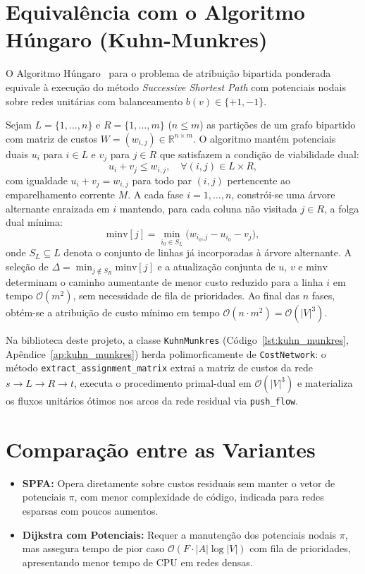 \section{Equivalência com o Algoritmo Húngaro (Kuhn-Munkres)}\label{sec:kuhn_munkres_eq}

O Algoritmo Húngaro~\cite{kuhn1955hungarian, munkres1957algorithms} para o problema de atribuição bipartida ponderada equivale à execução do método \textit{Successive Shortest Path} com potenciais nodais sobre redes unitárias com balanceamento $b(v) \in \{+1, -1\}$.

Sejam $L = \{1, \dots, n\}$ e $R = \{1, \dots, m\}$ ($n \le m$) as partições de um grafo bipartido com matriz de custos $W = (w_{i,j}) \in \mathbb{R}^{n \times m}$. O algoritmo mantém potenciais duais $u_i$ para $i \in L$ e $v_j$ para $j \in R$ que satisfazem a condição de viabilidade dual:
\begin{equation}
    u_i + v_j \le w_{i,j}, \quad \forall (i, j) \in L \times R,
\end{equation}
com igualdade $u_i + v_j = w_{i,j}$ para todo par $(i, j)$ pertencente ao emparelhamento corrente $M$. A cada fase $i = 1, \dots, n$, constrói-se uma árvore alternante enraizada em $i$ mantendo, para cada coluna não visitada $j \in R$, a folga dual mínima:
\begin{equation}
    \text{minv}[j] = \min_{i_0 \in S_L} \bigl(w_{i_0, j} - u_{i_0} - v_j\bigr),
\end{equation}
onde $S_L \subseteq L$ denota o conjunto de linhas já incorporadas à árvore alternante. A seleção de $\Delta = \min_{j \notin S_R} \text{minv}[j]$ e a atualização conjunta de $u$, $v$ e $\text{minv}$ determinam o caminho aumentante de menor custo reduzido para a linha $i$ em tempo $\mathcal{O}(m^2)$, sem necessidade de fila de prioridades. Ao final das $n$ fases, obtém-se a atribuição de custo mínimo em tempo $\mathcal{O}(n \cdot m^2) = \mathcal{O}(|V|^3)$.

Na biblioteca deste projeto, a classe \lstinline{KuhnMunkres} (Código~\ref{lst:kuhn_munkres}, Apêndice~\ref{ap:kuhn_munkres}) herda polimorficamente de \lstinline{CostNetwork}: o método \lstinline{extract_assignment_matrix} extrai a matriz de custos da rede $s \to L \to R \to t$, executa o procedimento primal-dual em $\mathcal{O}(|V|^3)$ e materializa os fluxos unitários ótimos nos arcos da rede residual via \lstinline{push_flow}.


\section{Comparação entre as Variantes}\label{sec:ssp_comparacao}

\begin{itemize}
    \item \textbf{SPFA:} Opera diretamente sobre custos residuais sem manter o vetor de potenciais $\pi$, com menor complexidade de código, indicada para redes esparsas com poucos aumentos.
    \item \textbf{Dijkstra com Potenciais:} Requer a manutenção dos potenciais nodais $\pi$, mas assegura tempo de pior caso $\mathcal{O}(F \cdot |A| \log |V|)$ com fila de prioridades, apresentando menor tempo de CPU em redes densas.
\end{itemize}
